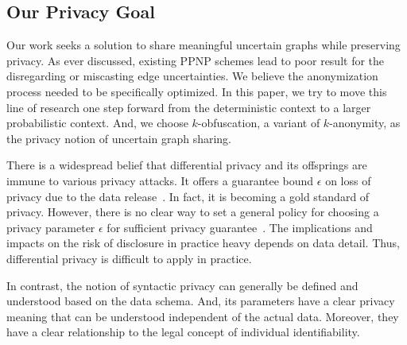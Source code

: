
\vspace{-2.5pt}
\subsection{Our Privacy Goal}
\vspace{-2.5pt}

Our work seeks a solution to share meaningful uncertain graphs while preserving privacy.
As ever discussed,  existing PPNP schemes lead to poor result for the disregarding or miscasting edge uncertainties. We believe the anonymization process needed to be specifically optimized. In this paper, we try to move this line of research one step forward from the deterministic context to a larger probabilistic context. And, we choose $k$-obfuscation, a variant of $k$-anonymity, as the privacy notion of  uncertain graph sharing.  

There is a widespread belief that differential privacy and its offsprings are immune to various privacy attacks. It offers a guarantee bound $\epsilon$ on loss of privacy due to the data release~\cite{Sala_Sharing_2011,Xiao_Differentially_2014}. In fact, it is becoming a gold standard of privacy.
However, there is no clear way to set a general policy for choosing a privacy parameter $\epsilon$ for sufficient privacy guarantee~\cite{lee2011}. The implications and impacts on the risk of disclosure in practice heavy depends on data detail. Thus, differential privacy is difficult to apply in practice. 

In contrast, the notion of syntactic privacy can generally be defined and understood based on the data schema. And, its parameters have a clear privacy meaning that can be understood independent of the actual data. Moreover, they have a clear relationship to the legal concept of individual identifiability. 
